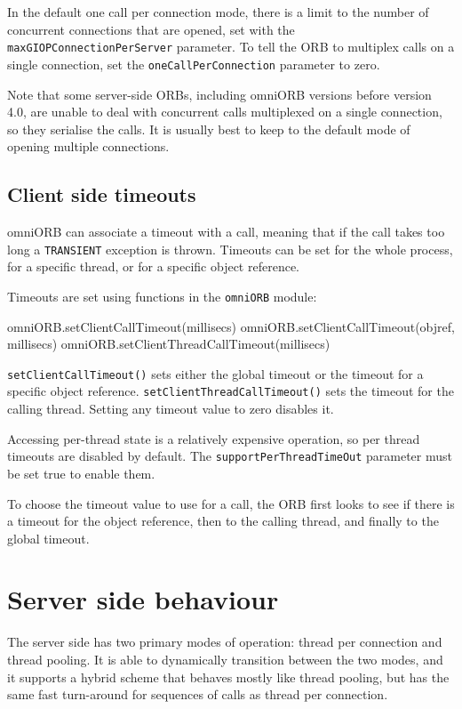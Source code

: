 \documentclass[draft,11pt,twoside,a4paper]{book}
\newcommand{\code}[1]{\texttt{#1}}
\newcommand{\op}[1]{\texttt{#1()}}
\newcommand{\dsc}{\discretionary{}{}{}}
\begin{document}
In the default one call per connection mode, there is a limit to the
number of concurrent connections that are opened, set with the
\code{maxGIOPConnection\dsc{}PerServer} parameter. To tell the ORB to
multiplex calls on a single connection, set the
\code{oneCallPerConnection} parameter to zero.

Note that some server-side ORBs, including omniORB versions before
version 4.0, are unable to deal with concurrent calls multiplexed on a
single connection, so they serialise the calls. It is usually best to
keep to the default mode of opening multiple connections.


\subsection{Client side timeouts}
\label{sec:timeoutAPI}

omniORB can associate a timeout with a call, meaning that if the call
takes too long a \code{TRANSIENT} exception is thrown. Timeouts can be
set for the whole process, for a specific thread, or for a specific
object reference.

Timeouts are set using functions in the \code{omniORB} module:

\begin{pylisting}
omniORB.setClientCallTimeout(millisecs)
omniORB.setClientCallTimeout(objref, millisecs)
omniORB.setClientThreadCallTimeout(millisecs)
\end{pylisting}

\op{setClientCallTimeout} sets either the global timeout or the
timeout for a specific object reference.
\op{setClientThreadCallTimeout} sets the timeout for the calling
thread. Setting any timeout value to zero disables it.

Accessing per-thread state is a relatively expensive operation, so per
thread timeouts are disabled by default. The
\code{supportPerThreadTimeOut} parameter must be set true to enable
them.

To choose the timeout value to use for a call, the ORB first looks to
see if there is a timeout for the object reference, then to the
calling thread, and finally to the global timeout.



\section{Server side behaviour}

The server side has two primary modes of operation: thread per
connection and thread pooling. It is able to dynamically transition
between the two modes, and it supports a hybrid scheme that behaves
mostly like thread pooling, but has the same fast turn-around for
sequences of calls as thread per connection.
\end{document}
